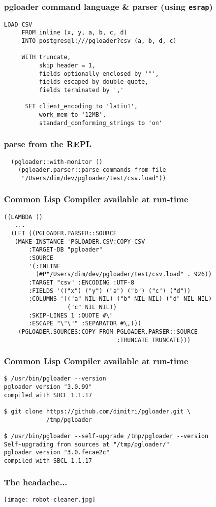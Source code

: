 \documentclass{beamer}
\begin{document}
\begin{frame}[fragile]
  \frametitle{pgloader command language \& parser (using \texttt{esrap})}

  \begin{verbatim}
LOAD CSV
     FROM inline (x, y, a, b, c, d)
     INTO postgresql:///pgloader?csv (a, b, d, c)

     WITH truncate,
          skip header = 1,
          fields optionally enclosed by '"',
          fields escaped by double-quote,
          fields terminated by ','

      SET client_encoding to 'latin1',
          work_mem to '12MB',
          standard_conforming_strings to 'on'
  \end{verbatim}
\end{frame}

\begin{frame}[fragile]
  \frametitle{parse from the REPL}

\begin{verbatim}
  (pgloader::with-monitor ()
    (pgloader.parser::parse-commands-from-file
     "/Users/dim/dev/pgloader/test/csv.load"))
\end{verbatim}
\end{frame}

\begin{frame}[fragile]
  \frametitle{Common Lisp Compiler available at run-time}

\begin{verbatim}
((LAMBDA ()
   ...
  (LET ((PGLOADER.PARSER::SOURCE
   (MAKE-INSTANCE 'PGLOADER.CSV:COPY-CSV
       :TARGET-DB "pgloader"
       :SOURCE
       '(:INLINE
         (#P"/Users/dim/dev/pgloader/test/csv.load" . 926))
       :TARGET "csv" :ENCODING :UTF-8
       :FIELDS '(("x") ("y") ("a") ("b") ("c") ("d"))
       :COLUMNS '(("a" NIL NIL) ("b" NIL NIL) ("d" NIL NIL)
                  ("c" NIL NIL))
       :SKIP-LINES 1 :QUOTE #\"
       :ESCAPE "\"\"" :SEPARATOR #\,)))
    (PGLOADER.SOURCES:COPY-FROM PGLOADER.PARSER::SOURCE
                                :TRUNCATE TRUNCATE)))
\end{verbatim}
\end{frame}

\begin{frame}[fragile]
  \frametitle{Common Lisp Compiler available at run-time}

\begin{verbatim}
$ /usr/bin/pgloader --version
pgloader version "3.0.99"
compiled with SBCL 1.1.17

$ git clone https://github.com/dimitri/pgloader.git \
            /tmp/pgloader

$ /usr/bin/pgloader --self-upgrade /tmp/pgloader --version
Self-upgrading from sources at "/tmp/pgloader/"
pgloader version "3.0.fecae2c"
compiled with SBCL 1.1.17
\end{verbatim}
\end{frame}

\begin{frame}
  \frametitle{The headache...}

  \begin{center}
    \texttt{[image: robot-cleaner.jpg]}
  \end{center}
\end{frame}
\end{document}
